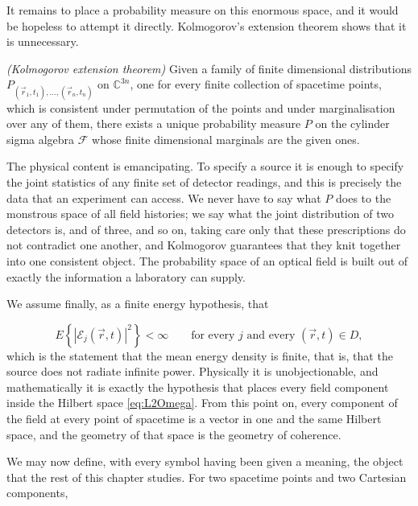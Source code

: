 		It remains to place a probability measure on this enormous space,
		and it would be hopeless to attempt it directly. Kolmogorov's extension theorem
		\citep{kolmogorov1933grundbegriffe} shows that it is unnecessary.

		\begin{myteo}
			\textit{(Kolmogorov extension theorem)} Given a family of finite dimensional
			distributions $P_{(\vec{r}_{1},t_{1}),\dots,(\vec{r}_{n},t_{n})}$ on
			$\mathbb{C}^{3n}$, one for every finite collection of spacetime points, which is
			consistent under permutation of the points and under marginalisation over any of
			them, there exists a unique probability measure $P$ on the cylinder sigma algebra
			$\mathcal{F}$ whose finite dimensional marginals are the given ones.
		\end{myteo}

		The physical content is emancipating. To specify a source it is enough to
		specify the joint statistics of any finite set of detector readings, and this is
		precisely the data that an experiment can access. We never have to say what $P$ does to
		the monstrous space of all field histories; we say what the joint distribution of two
		detectors is, and of three, and so on, taking care only that these prescriptions do not
		contradict one another, and Kolmogorov guarantees that they knit together into one
		consistent object. The probability space of an optical field is built out of exactly the
		information a laboratory can supply.

		We assume finally, as a finite energy hypothesis, that

		\begin{equation}\label{eq:FiniteEnergy}
			E\left\{\left|\mathcal{E}_{j}(\vec{r},t)\right|^{2}\right\}<\infty
			\qquad \text{for every } j \text{ and every } (\vec{r},t)\in D,
		\end{equation}
		which is the statement that the mean energy density is finite, that is, that the source
		does not radiate infinite power. Physically it is unobjectionable, and mathematically it
		is exactly the hypothesis that places every field component inside the Hilbert space
		\eqref{eq:L2Omega}. From this point on, every component of the field at every point of
		spacetime is a vector in one and the same Hilbert space, and the geometry of that space
		is the geometry of coherence.

		We may now define, with every symbol having been given a
		meaning, the object that the rest of this chapter studies. For two spacetime points and
		two Cartesian components,

